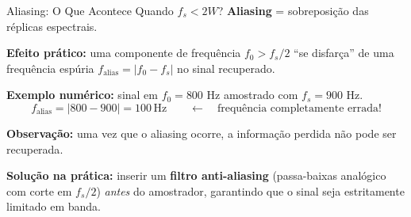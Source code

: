 \begin{frame}{Aliasing: O Que Acontece Quando $f_s < 2W$?}
  \textbf{Aliasing} = sobreposição das réplicas espectrais.

  \vspace{0.3cm}
  \textbf{Efeito prático:} uma componente de frequência $f_0 > f_s/2$
  ``se disfarça'' de uma frequência espúria
  $f_{\text{alias}} = |f_0 - f_s|$ no sinal recuperado.

  \vspace{0.3cm}
  \textbf{Exemplo numérico:} sinal em $f_0 = 800$ Hz amostrado com
  $f_s = 900$ Hz.
  \[
    f_{\text{alias}} = |800 - 900| = 100\,\text{Hz}
    \qquad\longleftarrow\quad\text{frequência completamente errada!}
  \]

  \vspace{0.25cm}
  \textbf{Observação:} uma vez que o aliasing ocorre, a informação
  perdida \alert{não pode ser recuperada}.

  \vspace{0.25cm}
  \textbf{Solução na prática:} inserir um \textbf{filtro anti-aliasing}
  (passa-baixas analógico com corte em $f_s/2$) \textit{antes} do
  amostrador, garantindo que o sinal seja estritamente limitado em banda.
\end{frame}


